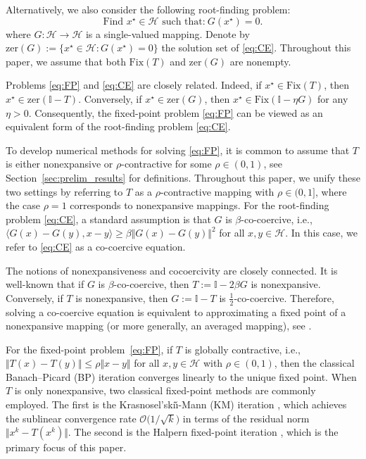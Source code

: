 \documentclass{article}
\theoremstyle{plain}
\theoremstyle{definition}
\newcommand{\Id}{\mathbb{I}}
\newcommand{\Hil}{\mathcal{H}}
\newcommand{\sets}[1]{\{#1\}}
\newcommand{\norms}[1]{\Vert#1\Vert}
\newcommand{\iprods}[1]{\langle #1\rangle}
\newcommand{\0}{\boldsymbol{0}}
\newcommand{\BigOs}[1]{\mathcal{O}\big(#1\big)}
\begin{document}
Alternatively, we also consider the following root-finding problem:
\begin{equation}\label{eq:CE}
\textrm{Find $x^{\star}\in \Hil$ such that:}~ G(x^{\star}) = 0.
\tag{CE}
\end{equation}
where $G : \Hil \to \Hil$ is a single-valued mapping.
Denote by $\mathrm{zer}(G) := \sets{x^{\star} \in \Hil : G(x^{\star}) = 0}$ the solution set of \eqref{eq:CE}.
Throughout this paper, we assume that both $\mathrm{Fix}(T)$ and $\mathrm{zer}(G)$ are nonempty.

Problems \eqref{eq:FP} and \eqref{eq:CE} are closely related. Indeed, if $x^{\star} \in \mathrm{Fix}(T)$, then $x^{\star} \in \mathrm{zer}(\Id - T)$. 
Conversely, if $x^{\star} \in \mathrm{zer}(G)$, then $x^{\star} \in \mathrm{Fix}(\Id - \eta G)$ for any $\eta > 0$. 
Consequently, the fixed-point problem \eqref{eq:FP} can be viewed as an equivalent form of the root-finding problem \eqref{eq:CE}.

To develop numerical methods for solving \eqref{eq:FP}, it is common to assume that $T$ is either nonexpansive or $\rho$-contractive for some $\rho \in (0,1)$, see Section~\ref{sec:prelim_results} for definitions. 
Throughout this paper, we unify these two settings by referring to $T$ as a $\rho$-contractive mapping with $\rho \in (0,1]$, where the case $\rho=1$ corresponds to nonexpansive mappings. 
For the root-finding problem \eqref{eq:CE}, a standard assumption is that $G$ is $\beta$-co-coercive, i.e., $\iprods{G(x) - G(y), x - y} \geq \beta\norms{G(x) - G(y)}^2$ for all $x, y\in\Hil$.
In this case, we refer to \eqref{eq:CE} as a co-coercive equation.

The notions of nonexpansiveness and cocoercivity are closely connected. 
It is well-known that if $G$ is $\beta$-co-coercive, then $T := \Id - 2\beta G$ is nonexpansive. 
Conversely, if $T$ is nonexpansive, then $G := \Id - T$ is $\frac{1}{2}$-co-coercive. 
Therefore, solving a co-coercive equation is equivalent to approximating a fixed point of a nonexpansive mapping (or more generally, an averaged mapping), see \cite{Bauschke2011}.

For the fixed-point problem~\eqref{eq:FP}, if $T$ is globally contractive, i.e., $\norms{T(x) - T(y)} \leq \rho\norms{x - y}$ for all $x, y \in \Hil$ with $\rho \in (0, 1)$, then the classical Banach--Picard (BP) iteration \cite{Banach1922} converges linearly to the unique fixed point. 
When $T$ is only nonexpansive, two classical fixed-point methods are commonly employed. 
The first is the Krasnosel'ski\v{\i}-Mann (KM) iteration \cite{Krasnoselskii1955,mann1953mean}, which achieves the sublinear convergence rate $\BigOs{1/\sqrt{k}}$ in terms of the residual norm $\norms{x^k - T(x^k)}$. 
The second is the Halpern fixed-point iteration \cite{halpern1967fixed}, which is the primary focus of this paper.
\end{document}
